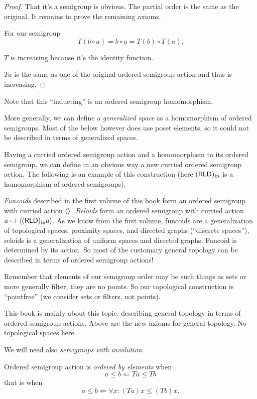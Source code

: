 \begin{proof}
That it's a semigroup is obvious. The partial order is the same as the original. It remains to prove the remaining axioms.

For our semigroup
\[ T(b\circ a) = b\circ a=T(b)\circ T(a). \]

$T$ is increasing because it's the identity function.

$Ta$ is the same as one of the original ordered semigroup action and thus is increasing.
\end{proof}

Note that this ``inducting'' is an ordered semigroup homomorphism.

More generally, we can define a \emph{generalized space} as a homomorphism of ordered semigroups. Most of the below however does use poset elements, so it could not be described in terms of generalized spaces.

Having a curried ordered semigroup action and a homomorphism to its ordered semigroup, we can define in an obvious way a new curried ordered semigroup action. The following is an example of this construction (here $(\mathsf{RLD})_{\mathrm{in}}$ is a homomorphism of ordered semigroups).

\emph{Funcoids} described in the first volume of this book form an ordered semigroup with curried action $\left\langle \right\rangle$. \emph{Reloids} form an ordered semigroup with curried action $a\mapsto\left\langle (\mathsf{RLD})_{\mathrm{in}} a\right\rangle$.
As we know from the first volume, funcoids are a generalization of topological spaces, proximity spaces, and directed graphs (``discrete spaces''), reloids is a generalization of uniform spaces and directed graphs. Funcoid is determined by its action. So most of the customary general topology can be described in terms of ordered semigroup actions!

Remember that elements of our semigroup order may be such things as sets or more generally filter, they are no points. So our topological construction is ``pointfree'' (we consider sets or filters, not points).

This book is mainly about this topic: describing general topology in terms of ordered semigroup actions. Above are the new axioms for general topology. No topological spaces here.

We will need also \emph{semigroups with involution}.

Ordered semigroup action is \emph{ordered by elements} when \[ a\leq b \Leftarrow Ta\leq Tb \] that is when \[ a\leq b \Leftarrow \forall x:(Ta)x\leq(Tb)x. \]


